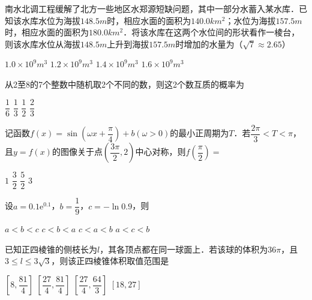\documentclass[11pt,addpoints,answers]{exam}
\begin{document}
\begin{multicols}{3}
\begin{questions}
        \question
        南水北调工程缓解了北方一些地区水郑源短缺问题，其中一部分水蓄入某水库．已知该水库水位为海拔$148.5m$时，相应水面的面积为$140.0km^2$；水位为海拔$157.5m$时，相应水面的面积为$180.0km^2$．将该水库在这两个水位间的形状看作一棱台，则该水库水位从海拔$148.5m$上升到海拔$157.5m$时增加的水量为（$\sqrt{7}\approx 2.65$）

        \begin{oneparchoices}
            \choice $1.0\times 10^9m^3$
            \choice $1.2\times 10^9m^3$
            \choice $1.4\times 10^9m^3$
            \choice $1.6\times 10^9m^3$
        \end{oneparchoices}

        \question
        从2至8的7个整数中随机取2个不同的数，则这2个数互质的概率为

        \begin{oneparchoices}
            \choice $\dfrac{1}{6}$
            \choice $\dfrac{1}{3}$
            \choice $\dfrac{1}{2}$
            \choice $\dfrac{2}{3}$
        \end{oneparchoices}

        \question
        记函数$f\left(x\right)=\sin \left(\omega x+\dfrac{\pi}{4}\right)+b\left(\omega>0\right)$的最小正周期为$T$．若$\dfrac{2\pi}{3}<T<\pi$，且$y=f\left(x\right)$的图像关于点$\left(\dfrac{3\pi}{2},2\right)$中心对称，则$f\left(\dfrac{\pi}{2}\right)=$

        \begin{oneparchoices}
            \choice $1$
            \choice $\dfrac{3}{2}$
            \choice $\dfrac{5}{2}$
            \choice $3$
        \end{oneparchoices}

        \question
        设$a=0.1\mathrm{e}^{0.1}$，$b=\dfrac{1}{9}$，$c=-\ln 0.9$，则

        \begin{oneparchoices}
            \choice $a<b<c$
            \choice $c<b<a$
            \choice $c<a<b$
            \choice $a<c<b$
        \end{oneparchoices}

        \question
        已知正四棱锥的侧枝长为$l$，其各顶点都在同一球面上．若该球的体积为$36\pi$，且$3\leqslant l\leqslant3\sqrt{3}$，则该正四棱锥体积取值范围是

        \begin{oneparchoices}
            \choice $\left[8,\dfrac{81}{4}\right]$
            \choice $\left[\dfrac{27}{4},\dfrac{81}{4}\right]$
            \choice $\left[\dfrac{27}{4},\dfrac{64}{3}\right]$
            \choice $\left[18,27\right]$
        \end{oneparchoices}


\end{questions}
\end{multicols}
\end{document}
